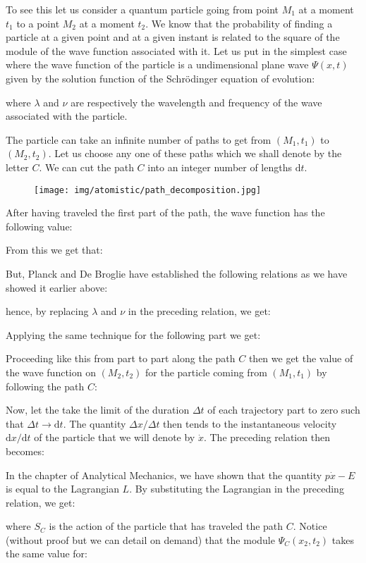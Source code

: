 	To see this let us consider a quantum particle going from point $M_1$ at a moment $t_1$ to a point $M_2$ at a moment $t_2$. We know that the probability of finding a particle at a given point and at a given instant is related to the square of the module of the wave function associated with it. Let us put in the simplest case where the wave function of the particle is a undimensional plane wave $\Psi(x,t)$ given by the solution function of the Schrödinger equation of evolution:
	
	where $\lambda$ and $\nu$ are respectively the wavelength and frequency of the wave associated with the particle.

	The particle can take an infinite number of paths to get from $(M_1,t_1)$ to $(M_2,t_2)$. Let us choose any one of these paths which we shall denote by the letter $C$. We can cut the path $C$ into an integer number of lengths $\mathrm{d}t$.
	\begin{figure}[H]
		\centering
		\texttt{[image: img/atomistic/path\_decomposition.jpg]}	
	\end{figure}
	After having traveled the first part of the path, the wave function has the following value:
	
	From this we get that:
	
	But, Planck and De Broglie have established the following relations as we have showed it earlier above:
	
	hence, by replacing $\lambda$ and $\nu$ in the preceding relation, we get:
	
	Applying the same technique for the following part we get:
	
	Proceeding like this from part to part along the path $C$ then we get the value of the wave function on $(M_2,t_2)$ for the particle coming from $(M_1,t_1)$ by following the path $C$:
	
	Now, let the take the limit of the duration $\Delta t$ of each trajectory part to zero such that $\Delta t\rightarrow \mathrm{d}t$. The quantity $\Delta x/\Delta t$ then tends to the instantaneous velocity $\mathrm{d}x/\mathrm{d}t$ of the particle that we will denote by $\dot{x}$. The preceding relation then becomes:
	
	In the chapter of Analytical Mechanics, we have shown that the quantity $p\dot{x}-E$ is equal to the Lagrangian $L$. By substituting the Lagrangian in the preceding relation, we get:
	
	where $S_C$ is the action of the particle that has traveled the path $C$.
	Notice (without proof but we can detail on demand) that the module $\Psi_C(x_2,t_2)$ takes the same value for:
	
